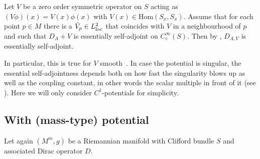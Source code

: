 \documentclass[10pt,a4paper]{amsart}
\numberwithin{equation}{section}
\begin{document}
\begin{Remark}\label{rem:ess_sa} Let $V$ be a zero order symmetric operator on $S$ acting as $(V\phi)(x)=V(x)\phi(x)$ with $V(x)\in \mathrm{Hom} (S_x,S_x)$. Assume that for each point $p\in M$ there is a $\tilde{V}_p\in L^2_{\rm{loc}}$ that coincides with $V$ in a neighbourhood of $p$ and such that $D_A+V$ is essentially self-adjoint on $C_c^\infty(S)$. Then by \cite[Theorem~2.1]{Chernoff2}, $D_{A,V}$ is essentially self-adjoint.

In particular, this is true for $V$ smooth~\cite[Theorem~2.2]{Chernoff}.
In case the potential is singular, the essential self-adjointness depends both on how fast the singularity blows up as well as the coupling constant, in other words the scalar multiple in front of it (see \cite[Section~4.3.3]{Thaller}). Here we will only consider $C^1$-potentials for simplicity.
\end{Remark}

\subsection{With (mass-type) potential}\label{sec:potential}
Let again $(M^m,g)$ be a Riemannian manifold with Clifford bundle $S$ and associated Dirac operator $D$.
\end{document}
